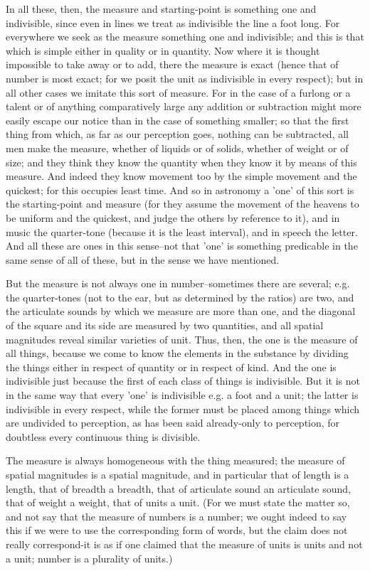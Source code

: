 In all these, then, the measure and starting-point is something one and indivisible, since even in lines we treat as indivisible the line a foot long. For everywhere we seek as the measure something one and indivisible; and this is that which is simple either in quality or in quantity. Now where it is thought impossible to take away or to add, there the measure is exact (hence that of number is most exact; for we posit the unit as indivisible in every respect); but in all other cases we imitate this sort of measure. For in the case of a furlong or a talent or of anything comparatively large any addition or subtraction might more easily escape our notice than in the case of something smaller; so that the first thing from which, as far as our perception goes, nothing can be subtracted, all men make the measure, whether of liquids or of solids, whether of weight or of size; and they think they know the quantity when they know it by means of this measure. And indeed they know movement too by the simple movement and the quickest; for this occupies least time. And so in astronomy a 'one' of this sort is the starting-point and measure (for they assume the movement of the heavens to be uniform and the quickest, and judge the others by reference to it), and in music the quarter-tone (because it is the least interval), and in speech the letter. And all these are ones in this sense--not that 'one' is something predicable in the same sense of all of these, but in the sense we have mentioned.

But the measure is not always one in number--sometimes there are several; e.g. the quarter-tones (not to the ear, but as determined by the ratios) are two, and the articulate sounds by which we measure are more than one, and the diagonal of the square and its side are measured by two quantities, and all spatial magnitudes reveal similar varieties of unit. Thus, then, the one is the measure of all things, because we come to know the elements in the substance by dividing the things either in respect of quantity or in respect of kind. And the one is indivisible just because the first of each class of things is indivisible. But it is not in the same way that every 'one' is indivisible e.g. a foot and a unit; the latter is indivisible in every respect, while the former must be placed among things which are undivided to perception, as has been said already-only to perception, for doubtless every continuous thing is divisible.

The measure is always homogeneous with the thing measured; the measure of spatial magnitudes is a spatial magnitude, and in particular that of length is a length, that of breadth a breadth, that of articulate sound an articulate sound, that of weight a weight, that of units a unit. (For we must state the matter so, and not say that the measure of numbers is a number; we ought indeed to say this if we were to use the corresponding form of words, but the claim does not really correspond-it is as if one claimed that the measure of units is units and not a unit; number is a plurality of units.)

